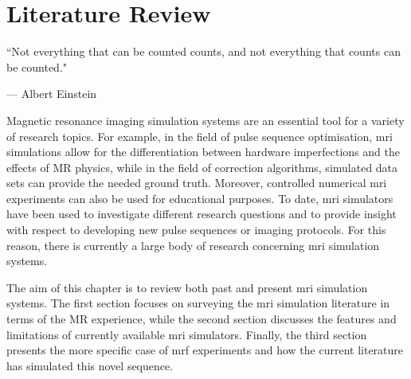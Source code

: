 \chapter{Literature Review}
\label{chapterlabel2}
\epigraph{``Not everything that can be counted counts, and not everything that counts can
be counted."}{--- \textup{Albert Einstein}}

Magnetic resonance imaging simulation systems are an essential tool for a variety of research topics.
For example, in the field of pulse sequence optimisation, \ac{mri} simulations allow for the differentiation between hardware imperfections and the effects of MR physics, 
while in the field of correction algorithms, simulated data sets can provide the needed ground truth.
Moreover, controlled numerical \ac{mri} experiments can also be used for educational purposes.
To date, \ac{mri} simulators have been used to investigate different research questions and to provide insight with respect to developing new pulse sequences or imaging protocols.
For this reason, there is currently a large body of research concerning \ac{mri} simulation systems.

\hfill

The aim of this chapter is to review both past and present \ac{mri} simulation systems.
The first section focuses on surveying the \ac{mri} simulation literature in terms of the MR experience, while the second section discusses the features and limitations of currently available \ac{mri} simulators.
Finally, the third section presents the more specific case of \ac{mrf} experiments and how the current literature has simulated this novel sequence.

\hfill





\hfill



%
\hfill


